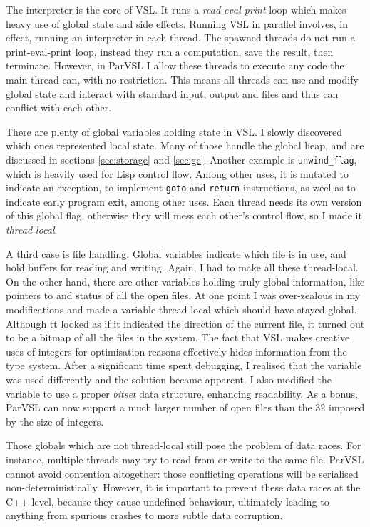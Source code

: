 The interpreter is the core of VSL. It runs a \emph{read-eval-print} loop which makes heavy
use of global state and side effects.
Running VSL in parallel involves, in effect, running an interpreter in each thread. The spawned threads do not
run a print-eval-print loop, instead they run a computation, save the result, then terminate. However,
in ParVSL I allow these threads to execute any code the main thread can, with no restriction. This means
all threads can use and modify global state and interact with standard input, output and files and
thus can conflict with each other.

There are plenty of global variables holding state in VSL. I slowly discovered which ones represented local
state. Many of those handle the global heap, and are discussed in sections \ref{sec:storage} and \ref{sec:gc}.
Another example is \verb|unwind_flag|, which is heavily used for Lisp control flow. Among other uses, it is
mutated to indicate an exception, to implement \verb|goto| and \verb|return| instructions,
as weel as to indicate early program exit,
among other uses. Each thread needs its own version of this global flag, otherwise they will mess each
other's control flow, so I made it \emph{thread-local}.

A third case is file handling. Global variables indicate which file is in use, and hold buffers for reading
and writing. Again, I had to make all these thread-local. On the other hand, there are other variables holding
truly global information, like pointers to and status of all the open files. At one point I was over-zealous in
my modifications and made a variable thread-local which should have stayed global. Although tt looked as if it indicated
the direction of the current file, it turned out to be a bitmap of all the files in the system. The fact
that VSL makes creative uses of integers for optimisation reasons effectively hides information from the type system.
After a significant time spent debugging, I realised that the variable was used differently and the solution became apparent.
I also modified the variable to use a proper \emph{bitset} data structure, enhancing readability.
As a bonus, ParVSL can now support a much larger number of open files than the 32 imposed by the size of integers.

Those globals which are not thread-local still pose the problem of data races. For instance, multiple threads
may try to read from or write to the same file. ParVSL cannot avoid contention altogether: those conflicting
operations will be serialised non-deterministically. However, it is important to prevent these data races at
the C++ level, because they cause undefined behaviour, ultimately leading to anything from spurious crashes
to more subtle data corruption.

